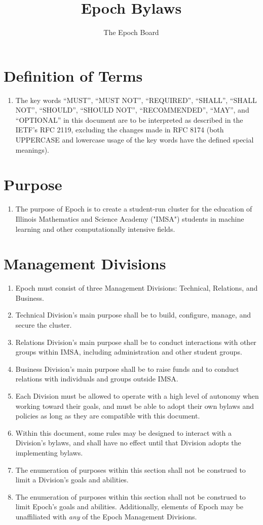 \documentclass{article}
\title{Epoch Bylaws}
\date{}
\author{The Epoch Board}
\begin{document}
\maketitle
\section*{Definition of Terms}
\begin{enumerate}
    \item The key words “MUST”, “MUST NOT”, “REQUIRED”, “SHALL”, “SHALL NOT”, “SHOULD”, “SHOULD NOT”, “RECOMMENDED”, “MAY”, and “OPTIONAL” in this document are to be interpreted as described in the IETF's RFC 2119, excluding the changes made in RFC 8174 (both UPPERCASE and lowercase usage of the key words have the defined special meanings).
\end{enumerate}
\section{Purpose}
\begin{enumerate}
    \item The purpose of Epoch is to create a student-run cluster for the education of Illinois Mathematics and Science Academy ("IMSA") students in machine learning and other computationally intensive fields.
\end{enumerate}
\section{Management Divisions}
\begin{enumerate}   
    \item Epoch must consist of three Management Divisions: Technical,  Relations, and Business.
    \item Technical Division's main purpose shall be to build, configure, manage, and secure the cluster.
    \item Relations Division's main purpose shall be to conduct interactions with other groups within IMSA, including administration and other student groups.
    \item Business Division's main purpose shall be to raise funds and to conduct relations with individuals and groups outside IMSA.
    \item Each Division must be allowed to operate with a high level of autonomy when working toward  their goals, and must be able to adopt their own bylaws and policies as long as they are compatible with this document.
    \item Within this document, some rules may be designed to interact with a Division's bylaws, and shall have no effect until that Division adopts the implementing bylaws.
    \item The enumeration of purposes within this section shall not be construed to limit a Division's goals and abilities.
    \item The enumeration of purposes within this section shall not be construed to limit Epoch's goals and abilities. Additionally, elements of Epoch may be unaffiliated with \textit{any} of the Epoch Management Divisions.
    
\end{enumerate}
\end{document}
